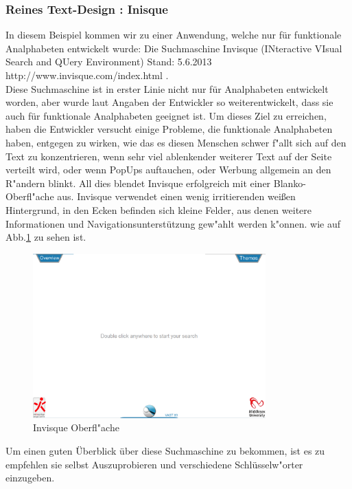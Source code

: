 \newpage

\subsubsection{Reines Text-Design : Inisque}
In diesem Beispiel kommen wir zu einer Anwendung, welche nur für funktionale Analphabeten entwickelt wurde: Die Suchmaschine Invisque (INteractive VIsual Search and QUery Environment)
						{Stand: 5.6.2013}
						{http://www.invisque.com/index.html}{}
.\\
Diese Suchmaschine ist in erster Linie nicht nur für Analphabeten entwickelt worden, aber wurde laut Angaben der Entwickler so weiterentwickelt, dass sie auch für funktionale Analphabeten geeignet ist. Um dieses Ziel zu erreichen, haben die Entwickler versucht einige Probleme, die funktionale Analphabeten haben, entgegen zu wirken, wie das es diesen Menschen schwer f"allt sich auf den Text zu konzentrieren, wenn sehr viel ablenkender weiterer Text auf der Seite verteilt wird, oder wenn PopUps auftauchen, oder Werbung allgemein an den R"andern blinkt. All dies blendet Invisque erfolgreich mit einer Blanko-Oberfl"ache aus. Invisque verwendet einen wenig irritierenden weißen Hintergrund, in den Ecken befinden sich kleine Felder, aus denen weitere Informationen und Navigationsunterstützung gew"ahlt werden k"onnen. wie auf Abb.\ref{fig:Invisque} zu sehen ist.

\begin{figure}[h]
	\centering
		\includegraphics[width=0.80\textwidth]{Daten/Inisque.PNG}
	\caption{Invisque Oberfl"ache}
	\label{fig:Invisque}
\end{figure}

Um einen guten Überblick über diese Suchmaschine zu bekommen, ist es zu empfehlen sie selbst Auszuprobieren und verschiedene Schlüsselw"orter einzugeben.

